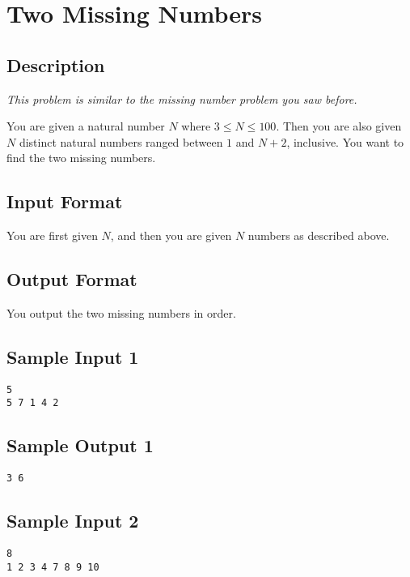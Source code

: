 

\begin{center}\end{center}
\vspace{5mm}


\section{Two Missing Numbers}
\subsection*{Description}
\textit{This problem is similar to the missing number problem you saw before.}

You are given a natural number $N$ where $3 \leq N \leq 100$. 
Then you are also given $N$ distinct natural numbers ranged between $1$ and $N+2$, inclusive.  You want to find the two missing numbers. 

\subsection*{Input Format}
You are first given $N$, and then you are given $N$ numbers as described above. 

\subsection*{Output Format}
You output the two missing numbers in order. 

\subsection*{Sample Input 1}
\begin{verbatim}
5
5 7 1 4 2
\end{verbatim}
\subsection*{Sample Output 1}
\begin{verbatim}
3 6
\end{verbatim}

\subsection*{Sample Input 2}
\begin{verbatim}
8
1 2 3 4 7 8 9 10
\end{verbatim}
